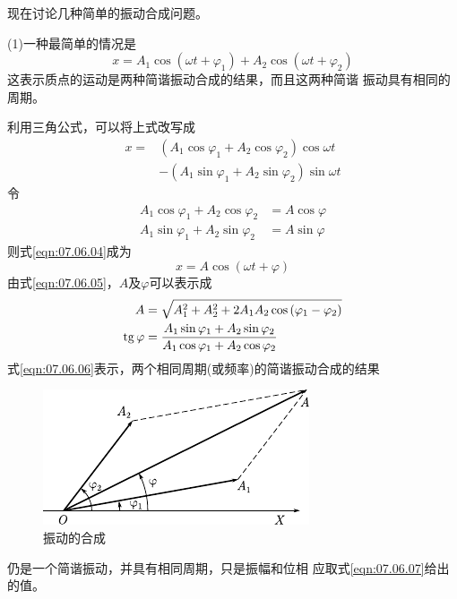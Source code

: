 现在讨论几种简单的振动合成问题。

(1)一种最简单的情况是
\begin{equation}\label{eqn:07.06.03}
	x = A _ { 1 } \cos \left( \omega t + \varphi _ { 1 } \right) + A _ { 2 } \cos \left( \omega t + \varphi _ { 2 } \right)
\end{equation}
这表示质点的运动是两种简谐振动合成的结果，而且这两种简谐
振动具有相同的周期。

利用三角公式，可以将上式改写成
\begin{equation}\label{eqn:07.06.04}
	\begin{aligned}
		x =& \left( A _ { 1 } \cos \varphi _ { 1 } + A _ { 2 } \cos \varphi _ { 2 } \right) \cos \omega t \\[-0.5em]
		&- \left( A _ { 1 } \sin \varphi _ { 1 } + A _ { 2 } \sin \varphi _ { 2 } \right) \sin \omega t
	\end{aligned}
\end{equation}
令\vspace{-1.56em}
\begin{equation}\label{eqn:07.06.05}
	\begin{aligned}
		A _ { 1 } \cos \varphi _ { 1 } + A _ { 2 } \cos \varphi _ { 2 } &= A  \cos \varphi  \\[-0.5em]
		A _ { 1 } \sin \varphi _ { 1 } + A _ { 2 }  \sin \varphi _ { 2 } &= A  \sin \varphi
	\end{aligned}
\end{equation}
则式\eqref{eqn:07.06.04}成为
\begin{equation}\label{eqn:07.06.06}
	x = A  \cos \left( \omega t +  \varphi \right)
\end{equation}
由式\ref{eqn:07.06.05}，$ A $及$ \varphi $可以表示成
\begin{equation}\label{eqn:07.06.07}
    \begin{split}
    A &= \sqrt { A _ { 1 } ^ { 2 } + A _ 2 ^ { 2 } + 2 A _ { 1 } A _ { 2 }  \cos \left( \varphi _ { 1 } -  \varphi _ { 2 } \right) } \\
    \operatorname{tg} \varphi &= \frac { A _ { 1 }  \sin \varphi _ { 1 } + A _ { 2 } \sin \varphi _ { 2 } } { A _ { 1 }  \cos \varphi _ { 1 } + A _ { 2 } \cos \varphi _ { 2 } }
    \end{split}
\end{equation}
式\eqref{eqn:07.06.06}表示，两个相同周期(或频率)的简谐振动合成的结果
\begin{figure}
    \vspace{-1em}
    \centering
    \includegraphics{figure/fig07.11}
    \caption{振动的合成}
    \label{fig:07.11}
\end{figure}
仍是一个简谐振动，并具有相同周期，只是振幅和位相
应取式\eqref{eqn:07.06.07}给出的值。

